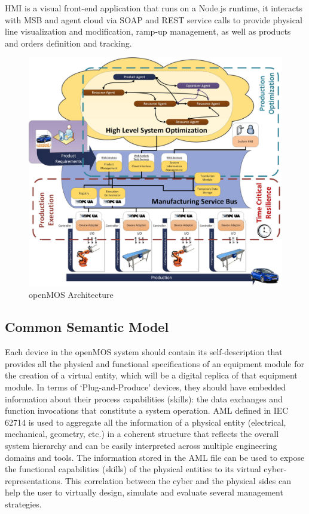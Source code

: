 \gls{HMI} is a visual front-end application that runs on a Node.js runtime, it interacts with \gls{MSB} and agent cloud via \gls{SOAP} and \gls{REST} service calls to provide physical line visualization and modification, ramp-up management, as well as products and orders definition and tracking. 

\begin{figure}[tb]
	\centering
	\includegraphics[scale=0.25]{images/diagram}
	\caption{openMOS Architecture}
	\label{fig:arch}
\end{figure}

\subsection{Common Semantic Model}
Each device in the \gls{openMOS} system should contain its self-description that provides all the physical and functional specifications of an equipment module for the creation of a virtual entity, which will be a digital replica of that equipment module. 
In terms of ‘Plug-and-Produce’ devices, they should have embedded information about their process capabilities (skills): the data exchanges and function invocations that constitute a system operation.
\gls{AML} defined in IEC 62714 is used to aggregate all the information of a physical entity (electrical, mechanical, geometry, etc.) in a coherent structure that reflects the overall system hierarchy and can be easily interpreted across multiple engineering domains and tools.
The information stored in the \gls{AML} file can be used to expose the functional capabilities (skills) of the physical entities to its virtual cyber-representations. 
This correlation between the cyber and the physical sides can help the user to virtually design, simulate and evaluate several management strategies.

